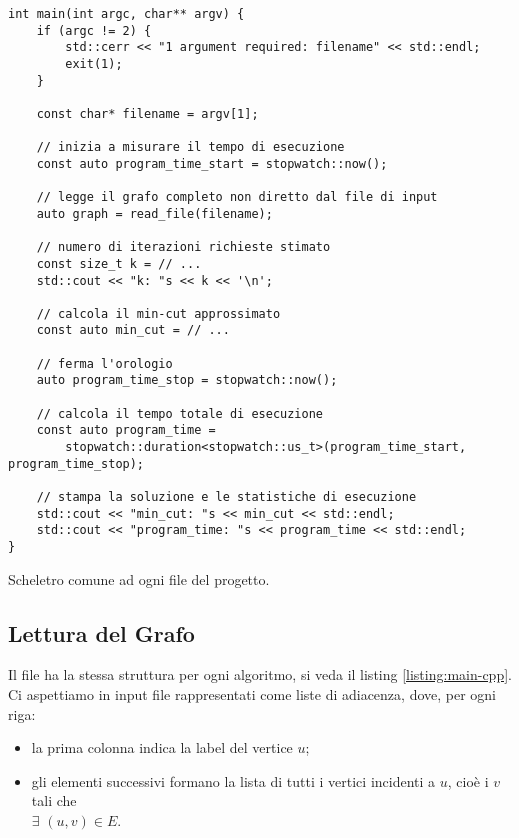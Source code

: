 \begin{listing}[!ht]
\begin{verbatim}
int main(int argc, char** argv) {
    if (argc != 2) {
        std::cerr << "1 argument required: filename" << std::endl;
        exit(1);
    }

    const char* filename = argv[1];

    // inizia a misurare il tempo di esecuzione
    const auto program_time_start = stopwatch::now();

    // legge il grafo completo non diretto dal file di input
    auto graph = read_file(filename);

    // numero di iterazioni richieste stimato
    const size_t k = // ...
    std::cout << "k: "s << k << '\n';

    // calcola il min-cut approssimato
    const auto min_cut = // ...
    
    // ferma l'orologio
    auto program_time_stop = stopwatch::now();

    // calcola il tempo totale di esecuzione
    const auto program_time =
        stopwatch::duration<stopwatch::us_t>(program_time_start, program_time_stop);

    // stampa la soluzione e le statistiche di esecuzione
    std::cout << "min_cut: "s << min_cut << std::endl;
    std::cout << "program_time: "s << program_time << std::endl;
}
\end{verbatim}
\caption{Scheletro comune ad ogni file  del progetto.}
\label{listing:main-cpp}
\end{listing}

\subsection{Lettura del Grafo}

\noindent Il file  ha la stessa struttura per ogni algoritmo, si veda il listing \ref{listing:main-cpp}.
Ci aspettiamo in input file rappresentati come liste di adiacenza, dove, per ogni riga:

\begin{itemize}
    \item la prima colonna indica la label del vertice $u$;
    \item gli elementi successivi formano la lista di tutti i vertici incidenti a $u$, cioè i $v$ tali che \\ $\exists$ $(u, v) \in E$.
\end{itemize}


